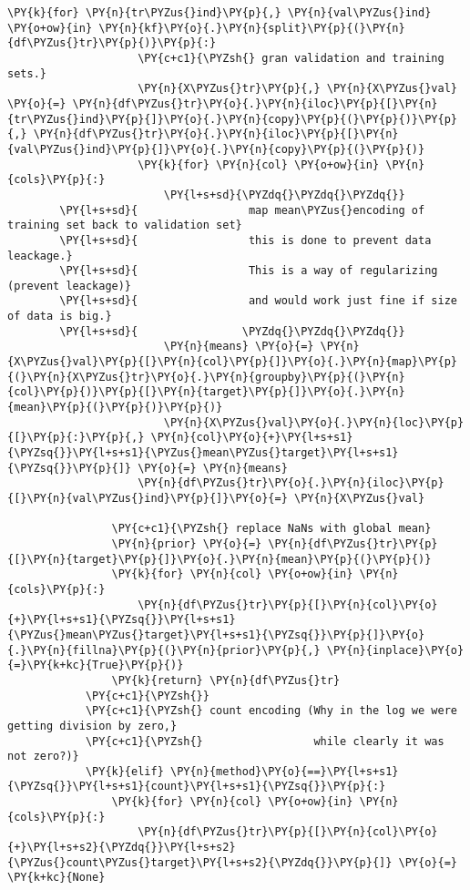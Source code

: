 \begin{Verbatim}[commandchars=\\\{\}]
                \PY{k}{for} \PY{n}{tr\PYZus{}ind}\PY{p}{,} \PY{n}{val\PYZus{}ind} \PY{o+ow}{in} \PY{n}{kf}\PY{o}{.}\PY{n}{split}\PY{p}{(}\PY{n}{df\PYZus{}tr}\PY{p}{)}\PY{p}{:}
                    \PY{c+c1}{\PYZsh{} gran validation and training sets.}
                    \PY{n}{X\PYZus{}tr}\PY{p}{,} \PY{n}{X\PYZus{}val} \PY{o}{=} \PY{n}{df\PYZus{}tr}\PY{o}{.}\PY{n}{iloc}\PY{p}{[}\PY{n}{tr\PYZus{}ind}\PY{p}{]}\PY{o}{.}\PY{n}{copy}\PY{p}{(}\PY{p}{)}\PY{p}{,} \PY{n}{df\PYZus{}tr}\PY{o}{.}\PY{n}{iloc}\PY{p}{[}\PY{n}{val\PYZus{}ind}\PY{p}{]}\PY{o}{.}\PY{n}{copy}\PY{p}{(}\PY{p}{)}
                    \PY{k}{for} \PY{n}{col} \PY{o+ow}{in} \PY{n}{cols}\PY{p}{:}
                        \PY{l+s+sd}{\PYZdq{}\PYZdq{}\PYZdq{}}
        \PY{l+s+sd}{                 map mean\PYZus{}encoding of training set back to validation set}
        \PY{l+s+sd}{                 this is done to prevent data leackage.}
        \PY{l+s+sd}{                 This is a way of regularizing (prevent leackage)}
        \PY{l+s+sd}{                 and would work just fine if size of data is big.}
        \PY{l+s+sd}{                \PYZdq{}\PYZdq{}\PYZdq{}}
                        \PY{n}{means} \PY{o}{=} \PY{n}{X\PYZus{}val}\PY{p}{[}\PY{n}{col}\PY{p}{]}\PY{o}{.}\PY{n}{map}\PY{p}{(}\PY{n}{X\PYZus{}tr}\PY{o}{.}\PY{n}{groupby}\PY{p}{(}\PY{n}{col}\PY{p}{)}\PY{p}{[}\PY{n}{target}\PY{p}{]}\PY{o}{.}\PY{n}{mean}\PY{p}{(}\PY{p}{)}\PY{p}{)}
                        \PY{n}{X\PYZus{}val}\PY{o}{.}\PY{n}{loc}\PY{p}{[}\PY{p}{:}\PY{p}{,} \PY{n}{col}\PY{o}{+}\PY{l+s+s1}{\PYZsq{}}\PY{l+s+s1}{\PYZus{}mean\PYZus{}target}\PY{l+s+s1}{\PYZsq{}}\PY{p}{]} \PY{o}{=} \PY{n}{means}
                    \PY{n}{df\PYZus{}tr}\PY{o}{.}\PY{n}{iloc}\PY{p}{[}\PY{n}{val\PYZus{}ind}\PY{p}{]}\PY{o}{=} \PY{n}{X\PYZus{}val}
        
                \PY{c+c1}{\PYZsh{} replace NaNs with global mean}
                \PY{n}{prior} \PY{o}{=} \PY{n}{df\PYZus{}tr}\PY{p}{[}\PY{n}{target}\PY{p}{]}\PY{o}{.}\PY{n}{mean}\PY{p}{(}\PY{p}{)}
                \PY{k}{for} \PY{n}{col} \PY{o+ow}{in} \PY{n}{cols}\PY{p}{:}
                    \PY{n}{df\PYZus{}tr}\PY{p}{[}\PY{n}{col}\PY{o}{+}\PY{l+s+s1}{\PYZsq{}}\PY{l+s+s1}{\PYZus{}mean\PYZus{}target}\PY{l+s+s1}{\PYZsq{}}\PY{p}{]}\PY{o}{.}\PY{n}{fillna}\PY{p}{(}\PY{n}{prior}\PY{p}{,} \PY{n}{inplace}\PY{o}{=}\PY{k+kc}{True}\PY{p}{)}
                \PY{k}{return} \PY{n}{df\PYZus{}tr}
            \PY{c+c1}{\PYZsh{}}
            \PY{c+c1}{\PYZsh{} count encoding (Why in the log we were getting division by zero,}
            \PY{c+c1}{\PYZsh{}                 while clearly it was not zero?)}
            \PY{k}{elif} \PY{n}{method}\PY{o}{==}\PY{l+s+s1}{\PYZsq{}}\PY{l+s+s1}{count}\PY{l+s+s1}{\PYZsq{}}\PY{p}{:}
                \PY{k}{for} \PY{n}{col} \PY{o+ow}{in} \PY{n}{cols}\PY{p}{:}
                    \PY{n}{df\PYZus{}tr}\PY{p}{[}\PY{n}{col}\PY{o}{+}\PY{l+s+s2}{\PYZdq{}}\PY{l+s+s2}{\PYZus{}count\PYZus{}target}\PY{l+s+s2}{\PYZdq{}}\PY{p}{]} \PY{o}{=} \PY{k+kc}{None}
        

\end{Verbatim}
